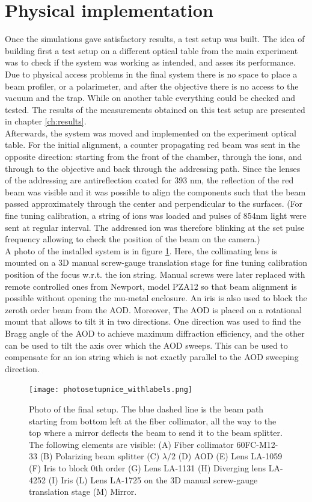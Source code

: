 \section{Physical implementation}
\label{design4}
Once the simulations gave satisfactory results, a test setup was built. The idea of building first a test setup on a different optical table from the main experiment was to check if the system was working as intended, and asses its performance. Due to physical access problems in the final system there is no space to place a beam profiler, or a polarimeter, and after the objective there is no access to the vacuum and the trap. While on another table everything could be checked and tested. The results of the measurements obtained on this test setup are presented in chapter \ref{ch:results}.\\
Afterwards, the system was moved and implemented on the experiment optical table. For the initial alignment, a counter propagating red beam was sent in the opposite direction: starting from the front of the chamber, through the ions, and through to the objective and back through the addressing path. Since the lenses of the addressing are antireflection coated for 393 nm, the reflection of the red beam was visible and it was possible to align the components such that the beam passed approximately through the center and perpendicular to the surfaces. (For fine tuning calibration, a string of ions was loaded and pulses of 854nm light were sent at regular interval. The addressed ion was therefore blinking at the set pulse frequency allowing to check the position of the beam on the camera.)\\
A photo of the installed system is in figure \ref{photosetup}. Here, the collimating lens is mounted on a 3D manual screw-gauge translation stage for fine tuning calibration position of the focus w.r.t. the ion string. Manual screws were later replaced with remote controlled ones from Newport, model PZA12 so that beam alignment is possible without opening the mu-metal enclosure. An iris is also used to block the zeroth order beam from the AOD. Moreover, The AOD is placed on a rotational mount that allows to tilt it in two directions. One direction was used to find the Bragg angle of the AOD to achieve maximum diffraction efficiency, and the other can be used to tilt the axis over which the AOD sweeps. This can be used to compensate for an ion string which is not exactly parallel to the AOD sweeping direction.

\begin{figure}[H]
\centering
\texttt{[image: photosetupnice\_withlabels.png]}
\caption{Photo of the final setup. The blue dashed line is the beam path starting from bottom left at the fiber collimator, all the way to the top where a mirror deflects the beam to send it to the beam splitter. The following elements are visible: (A) Fiber collimator 60FC-M12-33 (B) Polarizing beam splitter (C) $\lambda/2$ (D) AOD (E) Lens LA-1059 (F) Iris to block 0th order (G) Lens LA-1131 (H) Diverging lens LA-4252 (I) Iris (L) Lens LA-1725 on the 3D manual screw-gauge translation stage (M) Mirror. }
\label{photosetup}
\end{figure}
